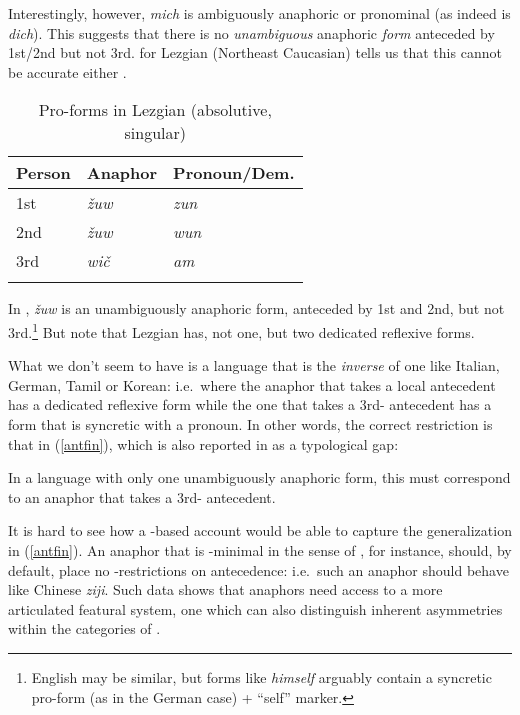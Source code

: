 \documentclass[output=paper, modfonts, nonflat]{langsci/langscibook}
\begin{document}
\noindent Interestingly, however, \textit{mich} is ambiguously anaphoric or
pronominal (as indeed is \textit{dich}).  This suggests that there is
no \emph{unambiguous} anaphoric \emph{form} anteceded by 1st/2nd but
not 3rd.  for Lezgian (Northeast Caucasian) tells us
that this cannot be accurate either \citep[][184]{haspelmath:1993}.\largerpage

\begin{table}
	\caption{Pro-forms in Lezgian (absolutive, singular)\label{lez}}
	\begin{tabular}{lll} 
		\lsptoprule
		{Person} & {Anaphor} & {Pronoun/Dem.}\\
		\midrule
		1st & \textit{\v{z}uw} & \textit{zun}\\
		2nd & \textit{\v{z}uw} & \textit{wun}\\
		3rd & \textit{wi\v{c}} & \textit{am}\\
		\lspbottomrule
	\end{tabular}
\end{table}

\noindent In , \textit{\v{z}uw} is an unambiguously anaphoric form,
anteceded by 1st and 2nd, but not 3rd.\footnote{English may be similar,
  but forms like \textit{himself} arguably contain a syncretic
  pro-form (as in the German case) + ``self'' marker.}
But note that Lezgian has, not one, but two dedicated reflexive forms.

What we don't seem to have is a language that is the \emph{inverse} of
one like Italian, German, Tamil or Korean: i.e.\ where the anaphor
that takes a local antecedent has a dedicated reflexive form while the
one that takes a 3rd-\person{} antecedent has a form that is syncretic
with a pronoun. In other words, the correct restriction is that in
(\ref{antfin}), which is also reported in \citet{comrie:1999} as a
typological gap:

\ea\label{antfin} In a language with only one unambiguously anaphoric
  form, this must correspond to an anaphor that takes a 3rd-\person{}
  antecedent.
\z

\noindent It is hard to see how a \ph-based account would be able to capture the
generalization in (\ref{antfin}). An anaphor that is \ph-minimal in
the sense of \citet{kratzer:2009}, for instance, should, by default,
place no \person-restrictions on antecedence: i.e.\ such an anaphor
should behave like Chinese \textit{ziji}. Such data shows that
anaphors need access to a more articulated featural system, one which
can also distinguish inherent asymmetries within the categories of
\person.
\end{document}
